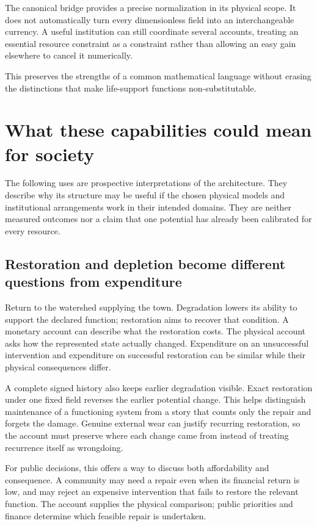 The canonical bridge provides a precise normalization in its physical scope. It does not automatically turn every dimensionless field into an interchangeable currency. A useful institution can still coordinate several accounts, treating an essential resource constraint as a constraint rather than allowing an easy gain elsewhere to cancel it numerically.

This preserves the strengths of a common mathematical language without erasing the distinctions that make life-support functions non-substitutable.

\section{What these capabilities could mean for society}
The following uses are prospective interpretations of the architecture. They describe why its structure may be useful if the chosen physical models and institutional arrangements work in their intended domains. They are neither measured outcomes nor a claim that one potential has already been calibrated for every resource.

\subsection{Restoration and depletion become different questions from expenditure}
Return to the watershed supplying the town. Degradation lowers its ability to support the declared function; restoration aims to recover that condition. A monetary account can describe what the restoration costs. The physical account asks how the represented state actually changed. Expenditure on an unsuccessful intervention and expenditure on successful restoration can be similar while their physical consequences differ.

A complete signed history also keeps earlier degradation visible. Exact restoration under one fixed field reverses the earlier potential change. This helps distinguish maintenance of a functioning system from a story that counts only the repair and forgets the damage. Genuine external wear can justify recurring restoration, so the account must preserve where each change came from instead of treating recurrence itself as wrongdoing.

For public decisions, this offers a way to discuss both affordability and consequence. A community may need a repair even when its financial return is low, and may reject an expensive intervention that fails to restore the relevant function. The account supplies the physical comparison; public priorities and finance determine which feasible repair is undertaken.

